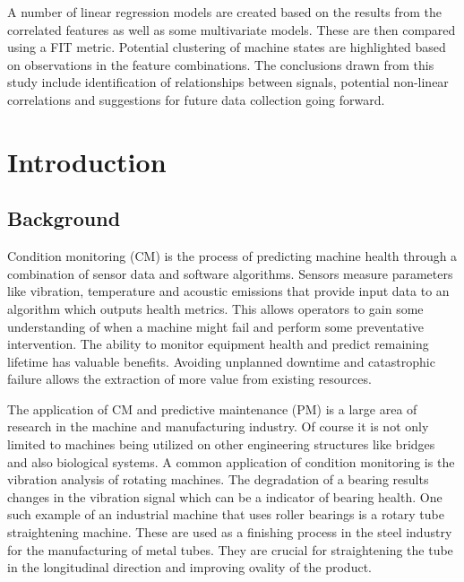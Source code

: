 \documentclass[]{article}
\begin{document}
A number of linear regression models are created based on the results from the correlated features as well as some multivariate models. These are then compared using a FIT metric. Potential clustering of machine states are highlighted based on observations in the feature combinations. The conclusions drawn from this study include identification of relationships between signals, potential non-linear correlations and suggestions for future data collection going forward.
\clearpage

\setcounter{tocdepth}{3}
\tableofcontents
\newpage

\listoffigures
\listoftables
\newpage
\printnoidxglossary[type=\acronymtype]
\newpage


\section{Introduction}
\subsection{Background}
Condition monitoring (\gls{CM}) is the process of predicting machine health through a combination of sensor data and software algorithms. Sensors measure parameters like vibration, temperature and acoustic emissions that provide input data to an algorithm which outputs health metrics. This allows operators to gain some understanding of when a machine might fail and perform some preventative intervention. The ability to monitor equipment health and predict remaining lifetime has valuable benefits. Avoiding unplanned downtime and catastrophic failure allows the extraction of more value from existing resources.

The application of CM and predictive maintenance (\gls{PM}) is a large area of research in the machine and manufacturing industry. Of course it is not only limited to machines being utilized on other engineering structures like bridges and also biological systems. 
A common application of condition monitoring is the vibration analysis of rotating machines. The degradation of a bearing results changes in the vibration signal which can be a indicator of bearing health. 
One such example of an industrial machine that uses roller bearings is a rotary tube straightening machine. These are used as a finishing process in the steel industry for the manufacturing of metal tubes. They are crucial for straightening the tube in the longitudinal direction and improving ovality of the product. 
\end{document}

